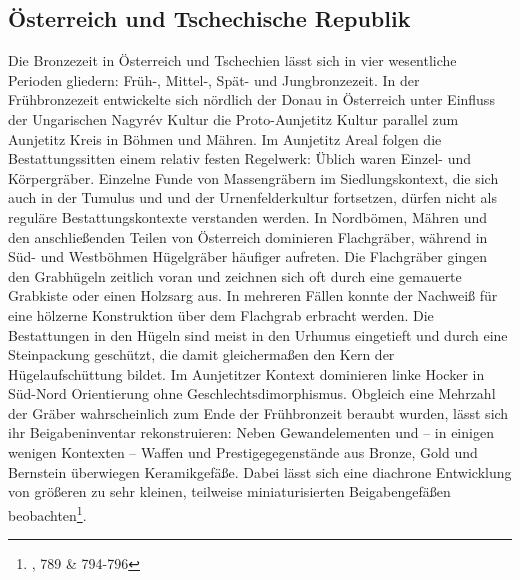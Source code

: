 \documentclass[openany,twoside,twocolumn]{book}
\let\rmarkdownfootnote\footnote%
\def\footnote{\protect\rmarkdownfootnote}
\begin{document}
\hypertarget{osterreich-und-tschechische-republik}{%
\subsection{Österreich und Tschechische
Republik}\label{osterreich-und-tschechische-republik}}

Die Bronzezeit in Österreich und Tschechien lässt sich in vier
wesentliche Perioden gliedern: Früh-, Mittel-, Spät- und Jungbronzezeit.
In der Frühbronzezeit entwickelte sich nördlich der Donau in Österreich
unter Einfluss der Ungarischen Nagyrév Kultur die Proto-Aunjetitz Kultur
parallel zum Aunjetitz Kreis in Böhmen und Mähren. Im Aunjetitz Areal
folgen die Bestattungssitten einem relativ festen Regelwerk: Üblich
waren Einzel- und Körpergräber. Einzelne Funde von Massengräbern im
Siedlungskontext, die sich auch in der Tumulus und und der
Urnenfelderkultur fortsetzen, dürfen nicht als reguläre
Bestattungskontexte verstanden werden. In Nordbömen, Mähren und den
anschließenden Teilen von Österreich dominieren Flachgräber, während in
Süd- und Westböhmen Hügelgräber häufiger aufreten. Die Flachgräber
gingen den Grabhügeln zeitlich voran und zeichnen sich oft durch eine
gemauerte Grabkiste oder einen Holzsarg aus. In mehreren Fällen konnte
der Nachweiß für eine hölzerne Konstruktion über dem Flachgrab erbracht
werden. Die Bestattungen in den Hügeln sind meist in den Urhumus
eingetieft und durch eine Steinpackung geschützt, die damit
gleichermaßen den Kern der Hügelaufschüttung bildet. Im Aunjetitzer
Kontext dominieren linke Hocker in Süd-Nord Orientierung ohne
Geschlechtsdimorphismus. Obgleich eine Mehrzahl der Gräber
wahrscheinlich zum Ende der Frühbronzeit beraubt wurden, lässt sich ihr
Beigabeninventar rekonstruieren: Neben Gewandelementen und -- in einigen
wenigen Kontexten -- Waffen und Prestigegegenstände aus Bronze, Gold und
Bernstein überwiegen Keramikgefäße. Dabei lässt sich eine diachrone
Entwicklung von größeren zu sehr kleinen, teilweise miniaturisierten
Beigabengefäßen beobachten\footnote{\textcite{lubos_czech_2013}, 789 \&
  794-796}.
\end{document}
